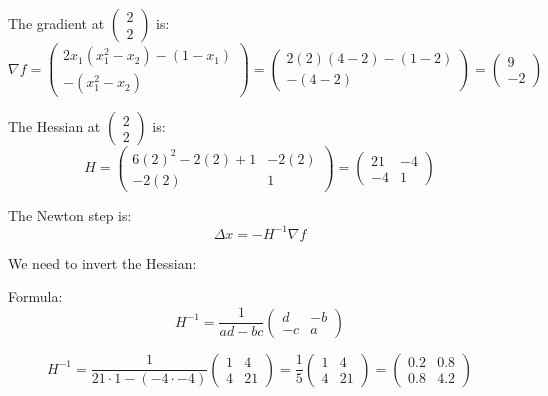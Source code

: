 \documentclass[12pt]{article}
\begin{document}
The gradient at \(\begin{pmatrix} 2 \\ 2 \end{pmatrix}\) is:
\[
\nabla f = \begin{pmatrix}
2x_1(x_1^2 - x_2) - (1 - x_1) \\
-(x_1^2 - x_2)
\end{pmatrix}
= \begin{pmatrix}
2(2)(4 - 2) - (1 - 2) \\
-(4 - 2)
\end{pmatrix}
= \begin{pmatrix}
9 \\
-2
\end{pmatrix}
\]

The Hessian at \(\begin{pmatrix} 2 \\ 2 \end{pmatrix}\) is:
\[
H = \begin{pmatrix}
6(2)^2 - 2(2) + 1 & -2(2) \\
-2(2) & 1
\end{pmatrix}
= \begin{pmatrix}
21 & -4 \\
-4 & 1
\end{pmatrix}
\]

The Newton step is:
\[
\Delta x = -H^{-1} \nabla f
\]

We need to invert the Hessian:

Formula:
\[
H^{-1} = \frac{1}{ad - bc} \begin{pmatrix}
d & -b \\
-c & a
\end{pmatrix}
\]

\[
H^{-1} = \frac{1}{21 \cdot 1 - (-4 \cdot -4)} \begin{pmatrix}
1 & 4 \\
4 & 21
\end{pmatrix}
= \frac{1}{5} \begin{pmatrix}
1 & 4 \\
4 & 21
\end{pmatrix}
= \begin{pmatrix}
0.2 & 0.8 \\
0.8 & 4.2
\end{pmatrix}
\]
\end{document}
